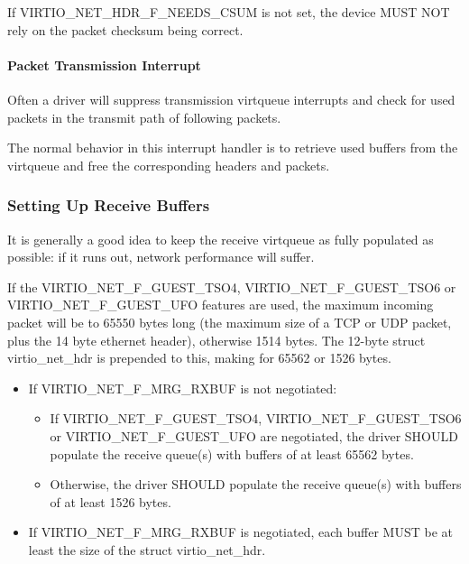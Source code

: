 If VIRTIO_NET_HDR_F_NEEDS_CSUM is not set, the device MUST NOT
rely on the packet checksum being correct.
\paragraph{Packet Transmission Interrupt}\label{sec:Device Types / Network Device / Device Operation / Packet Transmission / Packet Transmission Interrupt}

Often a driver will suppress transmission virtqueue interrupts
and check for used packets in the transmit path of following
packets.

The normal behavior in this interrupt handler is to retrieve
used buffers from the virtqueue and free the corresponding
headers and packets.

\subsubsection{Setting Up Receive Buffers}\label{sec:Device Types / Network Device / Device Operation / Setting Up Receive Buffers}

It is generally a good idea to keep the receive virtqueue as
fully populated as possible: if it runs out, network performance
will suffer.

If the VIRTIO_NET_F_GUEST_TSO4, VIRTIO_NET_F_GUEST_TSO6 or
VIRTIO_NET_F_GUEST_UFO features are used, the maximum incoming packet
will be to 65550 bytes long (the maximum size of a
TCP or UDP packet, plus the 14 byte ethernet header), otherwise
1514 bytes.  The 12-byte struct virtio_net_hdr is prepended to this,
making for 65562 or 1526 bytes.


\begin{itemize}
\item If VIRTIO_NET_F_MRG_RXBUF is not negotiated:
  \begin{itemize}
    \item If VIRTIO_NET_F_GUEST_TSO4, VIRTIO_NET_F_GUEST_TSO6 or
      VIRTIO_NET_F_GUEST_UFO are negotiated, the driver SHOULD populate
      the receive queue(s) with buffers of at least 65562 bytes.
    \item Otherwise, the driver SHOULD populate the receive queue(s)
      with buffers of at least 1526 bytes.
  \end{itemize}
\item If VIRTIO_NET_F_MRG_RXBUF is negotiated, each buffer MUST be at
least the size of the struct virtio_net_hdr.
\end{itemize}

